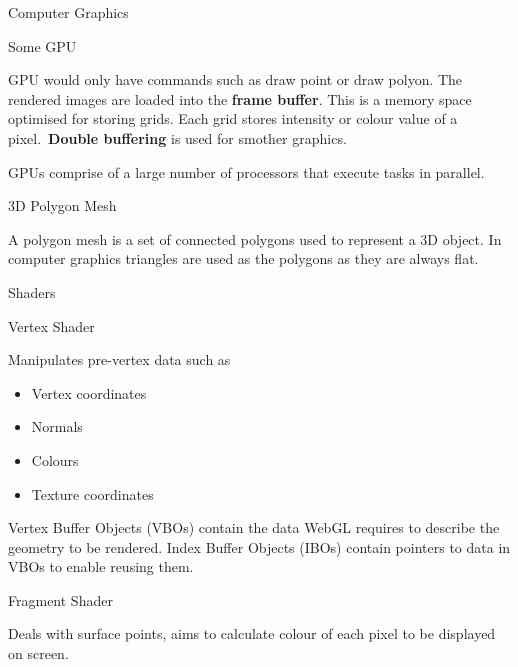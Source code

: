 \documentclass[12pt, letterpaper]{article}
\begin{document}
\begin{section}{Computer Graphics}

  \begin{subsection}{Some GPU}

    GPU would only have commands such as draw point or draw polyon. The rendered
    images are loaded into the \textbf{frame buffer}. This is a memory space
    optimised for storing grids. Each grid stores intensity or colour value of a
    pixel.\ \textbf{Double buffering} is used for smother graphics.

    GPUs comprise of a large number of processors that execute tasks in parallel.

  \end{subsection}

  \begin{subsection}{3D Polygon Mesh}

    A polygon mesh is a set of connected polygons used to represent a 3D object.
    In computer graphics triangles are used as the polygons as they are always
    flat.

  \end{subsection}

  \begin{subsection}{Shaders}

    \begin{subsubsection}{Vertex Shader}

      Manipulates pre-vertex data such as
      \begin{itemize}
        \item Vertex coordinates
        \item Normals
        \item Colours
        \item Texture coordinates
      \end{itemize}

      Vertex Buffer Objects (VBOs) contain the data WebGL requires to describe the
      geometry to be rendered. Index Buffer Objects (IBOs) contain pointers to
      data in VBOs to enable reusing them.

    \end{subsubsection}

    \begin{subsubsection}{Fragment Shader}

      Deals with surface points, aims to calculate colour of each pixel to be
      displayed on screen.

    \end{subsubsection}


\end{subsection}
\end{section}
\end{document}
